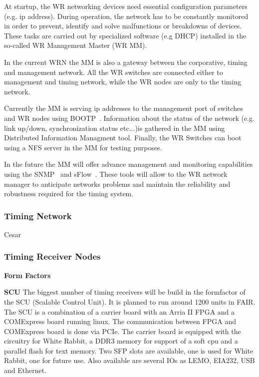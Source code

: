 At startup, the WR networking devices need essential configuration parameters (e.g. ip
address). During operation, the network has to be constantly monitored in
order to prevent, identify and solve malfunctions or breakdowns of devices. 
These tasks are carried out by specialized software (e.g DHCP) installed in the
so-called WR Management Master (WR MM). 

In the current WRN the MM is also a gateway between the corporative, timing and management 
network. All the WR switches are connected either to management and timing
network, while the WR nodes are only to the timing network. 

Currently the MM is serving ip addresses to the management port of switches and WR
nodes using BOOTP~\cite{bootp}. Information about the status of the network (e.g.
link up/down, synchronization status etc...)is gathered in the MM using Distributed Information Managment
tool. Finally, the WR Switches can boot using a NFS server in the MM for testing
purposes. 

In the future the MM will offer advance management and monitoring capabilities
using the SNMP~\cite{snmp} and sFlow~\cite{sflow}. These tools will allow to the 
WR network manager to anticipate networks problems and maintain the reliability
and robustness required for the timing system.


\subsubsection{Timing Network}

Cesar

\subsubsection{Timing Receiver Nodes}


\textbf{Form Factors}

\textbf{SCU}
The biggest number of timing receivers will be build in the formfactor
of the SCU (Scalable Control Unit).
It is planned to run around 1200 units in FAIR.
The SCU is a combination of a carrier board with an Arria II FPGA and a
COMExpress board running
linux. The communication between FPGA and COMExpress board is done via
PCIe. The carrier board is
equipped with the circuitry for White Rabbit, a DDR3 memory for support
of a soft cpu
and a parallel flash for text memory. Two SFP slots are available, one
is used for White Rabbit, one for future
use. Also available are several IOs as LEMO, EIA232, USB and Ethernet.

